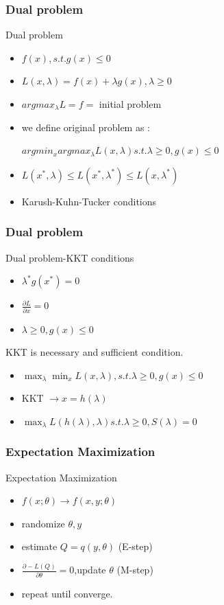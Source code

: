 \documentclass[professionalfonts]{beamer}
\begin{document}
\begin{frame}
\frametitle{Dual problem}
Dual problem
\begin{itemize}
\item $f(x), s.t. g(x) \le 0$
\item $L(x,\lambda) = f(x) + \lambda g(x), \lambda \geq 0$
\item $argmax_\lambda L = f =$ initial problem
\item we define original problem as :

$argmin_x argmax_\lambda L(x,\lambda) s.t. \lambda \geq 0, g(x) \leq 0$

\item $ L(x^*,\lambda) \leq L(x^*,\lambda^*)  \leq L(x,\lambda^*)$
\item Karush-Kuhn-Tucker conditions
\end{itemize}
\end{frame}

\begin{frame}
\frametitle{Dual problem}
Dual problem-KKT conditions
\begin{itemize}
\item $\lambda^* g(x^*)=0$
\item $\frac{\partial L}{  \partial x} =0$ 
\item $\lambda \geq 0 , g(x) \leq 0$
\end{itemize}
KKT is necessary and sufficient condition.
\begin{itemize}
\item $\max_\lambda \min_x L(x,\lambda) , s.t. \lambda \geq 0, g(x) \leq 0$
\item KKT $\rightarrow x=h(\lambda)$
\item $\max_\lambda L(h(\lambda),\lambda) s.t. \lambda \geq 0, S(\lambda)=0$
\end{itemize}
\end{frame}

\begin{frame}
\frametitle{Expectation Maximization}
Expectation Maximization
\begin{itemize}
\item $f(x;\theta) \rightarrow f(x,y;\theta)$
\item randomize $\theta, y$
\item estimate $Q=q(y,\theta)$ (E-step)
\item $\frac{\partial -L(Q)}{\partial \theta}=0$,update $\theta$ (M-step)
\item repeat until converge.
\end{itemize}
\end{frame}
\end{document}
